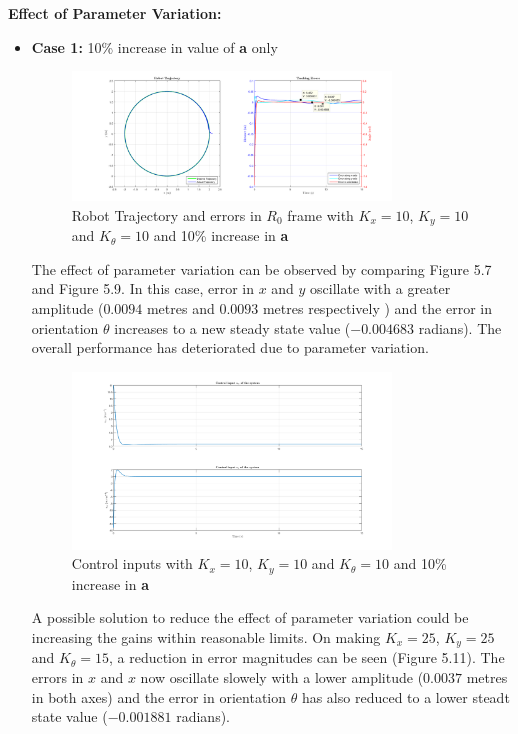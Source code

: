 \documentclass{article}
\begin{document}
\textbf{Effect of Parameter Variation:}
\begin{itemize}
\item \textbf{Case 1:} 10\% increase in value of \textbf{a} only
\begin{figure}[H]
\centering
\includegraphics[width = 0.8\textwidth]{Figures/figure10.png}
\caption{ Robot Trajectory and errors in $R_{0}$ frame with $K_{x}=10$, $K_{y}=10$ and $K_{\theta}=10$ and 10\% increase in \textbf{a} }
\label{fig:figure10}
\end{figure}
The effect of parameter variation can be observed by comparing Figure 5.7 and Figure 5.9. In this case, error in $x$ and $y$ oscillate with a greater amplitude ($0.0094$ metres and $0.0093$ metres respectively )  and the error in orientation $\theta$ increases to a new steady state value ($-0.004683$ radians). The overall performance has deteriorated due to parameter variation.
\begin{figure}[H]
\centering
\includegraphics[width = 0.8\textwidth]{Figures/figure11.png}
\caption{ Control inputs with $K_{x}=10$, $K_{y}=10$ and $K_{\theta}=10$ and 10\% increase in \textbf{a} }
\label{fig:figure11}
\end{figure}

A possible solution to reduce the effect of parameter variation could be increasing the gains within reasonable limits. On making  $K_{x}=25$, $K_{y}=25$ and $K_{\theta}=15$, a reduction in error magnitudes can be seen (Figure 5.11). The errors in $x$ and $x$ now oscillate slowely with a lower amplitude ($0.0037$ metres in both axes) and the error in orientation $\theta$ has also reduced to a lower steadt state value ($-0.001881$ radians).


\end{itemize}
\end{document}
